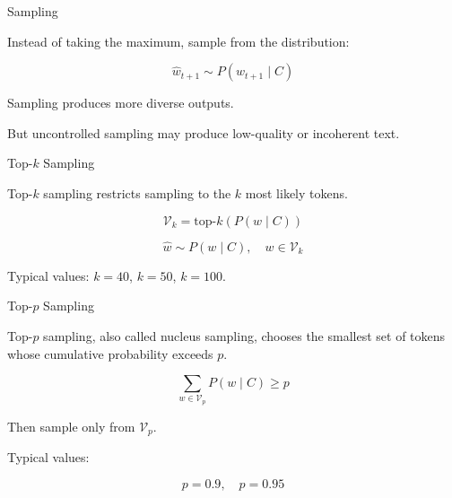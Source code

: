 \documentclass[aspectratio=169]{beamer}
\begin{document}
\begin{frame}{Sampling}

Instead of taking the maximum, sample from the distribution:

\[
\hat{w}_{t+1}
\sim
P(w_{t+1} \mid C)
\]

\vspace{0.4cm}

Sampling produces more diverse outputs.

\vspace{0.4cm}

But uncontrolled sampling may produce low-quality or incoherent text.

\end{frame}

\begin{frame}{Top-$k$ Sampling}

Top-$k$ sampling restricts sampling to the $k$ most likely tokens.

\vspace{0.4cm}

\[
\mathcal{V}_k
=
\text{top-}k
\left(
P(w \mid C)
\right)
\]

\[
\hat{w}
\sim
P(w \mid C), \quad w \in \mathcal{V}_k
\]

\vspace{0.4cm}

Typical values: $k=40$, $k=50$, $k=100$.

\end{frame}

\begin{frame}{Top-$p$ Sampling}

Top-$p$ sampling, also called nucleus sampling, chooses the smallest set of tokens whose cumulative probability exceeds $p$.

\[
\sum_{w \in \mathcal{V}_p}
P(w \mid C)
\geq p
\]

\vspace{0.4cm}

Then sample only from $\mathcal{V}_p$.

\vspace{0.4cm}

Typical values:

\[
p = 0.9,\quad p=0.95
\]

\end{frame}
\end{document}

